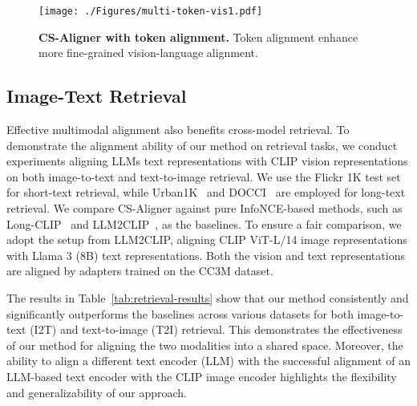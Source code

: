 \begin{figure}[t]
  \centering  \texttt{[image: ./Figures/multi-token-vis1.pdf]}
  \vspace{-7mm}
\caption{\textbf{CS-Aligner with token alignment.} Token alignment enhance more fine-grained vision-language alignment.}
\vspace{-4mm}
\label{fig:token-alignment}
\end{figure}



\subsection{Image-Text Retrieval}
\label{sec.retriev}


Effective multimodal alignment also benefits cross-model retrieval.
To demonstrate the alignment ability of our method on retrieval tasks, we conduct experiments aligning LLMs \citep{dubey2024llama} text representations with CLIP vision representations on both {image-to-text} and {text-to-image} retrieval. 
We use the Flickr 1K test set~\citep{young2014image} for short-text retrieval, while Urban1K~\citep{zhang2025long} and DOCCI~\citep{onoe2025docci} are employed for long-text retrieval. 
We compare CS-Aligner against pure InfoNCE-based methods, such as Long-CLIP~\citep{zhang2025long} and LLM2CLIP~\citep{huang2024llm2clip}, as the baselines.
To ensure a fair comparison, we adopt the setup from LLM2CLIP, aligning CLIP ViT-L/14 image representations with Llama 3 (8B) text representations. Both the vision and text representations are aligned by adapters trained on the CC3M dataset.



 The results in Table~\ref{tab:retrieval-results} show that our method consistently and significantly outperforms the baselines across various datasets for both image-to-text (I2T) and text-to-image (T2I) retrieval. This demonstrates the effectiveness of our method for aligning the two modalities into a shared space. Moreover, the ability to align a different text encoder (LLM) with the successful alignment of an LLM-based text encoder with the CLIP image encoder highlights the flexibility and generalizability of our approach.







